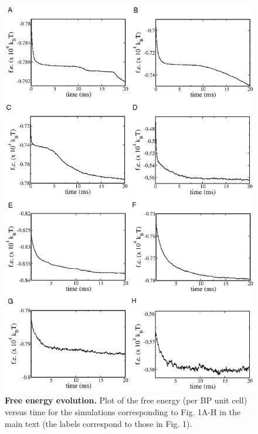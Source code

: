\documentclass[12pt,twoside]{article}
\begin{document}
\begin{figure}[!h]
\begin{center}
\includegraphics[scale=0.49]{support-fig4.png}
\end{center}
\caption{\textbf{Free energy evolution.}
Plot of the free energy (per BP unit cell) versus time
for the simulations corresponding to Fig. 1A-H in the main text
(the labels correspond to those in Fig. 1).
}
\end{figure}

\newpage
\end{document}
